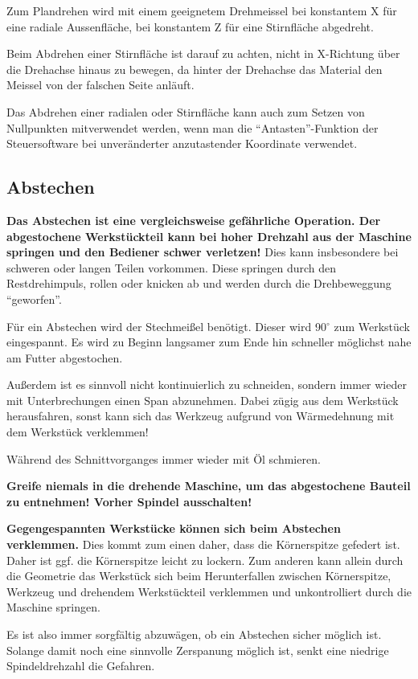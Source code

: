 \documentclass{\basedir/fablab-document}
\begin{document}
Zum Plandrehen wird mit einem geeignetem  Drehmeissel bei konstantem X für eine radiale Aussenfläche, bei konstantem Z für eine Stirnfläche abgedreht.

Beim Abdrehen einer Stirnfläche ist darauf zu achten, nicht in X-Richtung über die Drehachse hinaus zu bewegen, da hinter der Drehachse das Material den Meissel von der falschen Seite anläuft.

Das Abdrehen einer radialen oder Stirnfläche kann auch zum Setzen von Nullpunkten mitverwendet werden, wenn man die \enquote{Antasten}-Funktion der Steuersoftware bei unveränderter anzutastender Koordinate verwendet.

\subsection{Abstechen}

\textbf{Das Abstechen ist eine vergleichsweise gefährliche Operation. Der abgestochene Werkstückteil kann bei hoher Drehzahl aus der Maschine springen und den Bediener schwer verletzen!} Dies kann insbesondere bei schweren oder langen Teilen vorkommen. Diese springen durch den Restdrehimpuls, rollen oder knicken ab und werden durch die Drehbeweggung \enquote{geworfen}.

Für ein Abstechen wird der Stechmeißel benötigt. Dieser wird 90$^\circ$ zum Werkstück eingespannt.
Es wird zu Beginn langsamer zum Ende hin schneller möglichst nahe am Futter abgestochen.

Außerdem ist es sinnvoll nicht kontinuierlich zu schneiden, sondern immer wieder mit Unterbrechungen einen Span abzunehmen.
Dabei zügig aus dem Werkstück herausfahren, sonst kann sich das Werkzeug aufgrund von Wärmedehnung mit dem Werkstück verklemmen!

Während des Schnittvorganges immer wieder mit Öl schmieren.

\textbf{Greife niemals in die drehende Maschine, um das abgestochene Bauteil zu entnehmen! Vorher Spindel ausschalten!}


\textbf{Gegengespannten Werkstücke können sich beim Abstechen verklemmen.} Dies kommt zum einen daher, dass die Körnerspitze gefedert ist. Daher ist ggf. die Körnerspitze leicht zu lockern. Zum anderen kann allein durch die Geometrie das Werkstück sich beim Herunterfallen zwischen Körnerspitze, Werkzeug und drehendem Werkstückteil verklemmen und unkontrolliert durch die Maschine springen.

Es ist also immer sorgfältig abzuwägen, ob ein Abstechen sicher möglich ist. Solange damit noch eine sinnvolle Zerspanung möglich ist, senkt eine niedrige Spindeldrehzahl die Gefahren.
\end{document}
